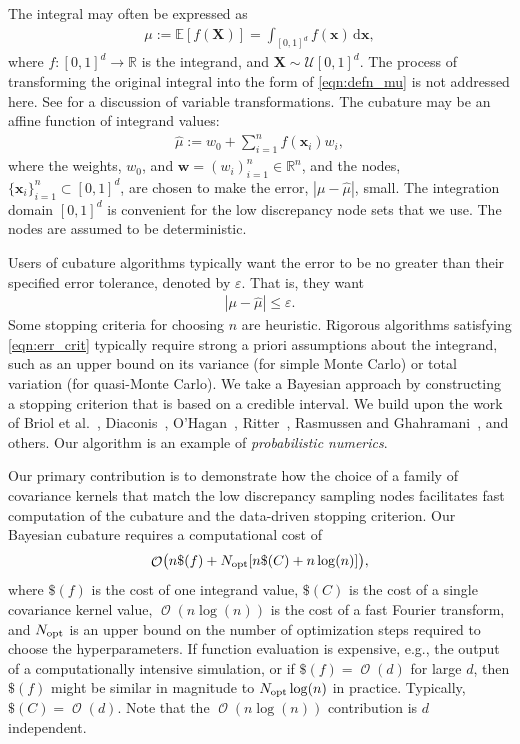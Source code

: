 \documentclass{svjour3}                     %
\DeclareMathOperator{\Order}{{\mathcal O}}
\newcommand{\bm}[1]{\boldsymbol{#1}}
\newcommand{\dif}[1]{\text{d}{#1}}
\newcommand{\reals}{\mathbb{R}}
\newcommand{\Ex}{\mathbb{E}}
\newcommand{\vw}{\bm{w}}
\newcommand{\vx}{\bm{x}}
\newcommand{\opt}{{\textup{opt}}}
\newcommand{\hmu}{\widehat{\mu}}
\newcommand{\errtol}{\varepsilon}
\def\abs#1{\ensuremath{\left \lvert #1 \right \rvert}}
\begin{document}
The integral may often be expressed as
\begin{align}
\label{eqn:defn_mu}
\mu:= \Ex[f(\boldsymbol{X})] = \int_{[0,1]^d} f(\vx)\, \dif\vx, 
\end{align}
where $f:[0,1]^d \to \reals$ is the integrand, and $\boldsymbol{X} \sim \mathcal{U}[0,1]^d$.  The process of transforming the original integral into the form of \eqref{eqn:defn_mu} is not addressed here. See \cite[Section 2.11]{DicEtal14a} 
for a discussion of variable transformations. The cubature may be an affine function of integrand values:
\begin{align}
\label{eqn:defn_hmu}  %
\hmu := w_0 + \sum_{i=1}^{n} f(\vx_i) w_i,
\end{align}
where the weights, $w_0$, and  $\vw = (w_i)_{i=1}^n \in \reals^n$, and the nodes, $\{\vx_i\}_{i=1}^n \subset [0,1]^d$, are chosen to make the error, $\abs{\mu - \hmu}$, small. The integration domain $[0,1]^d$ is convenient for the low discrepancy node sets \cite{DicEtal14a,SloJoe94} that we use.  The nodes are assumed to be deterministic.

Users of cubature algorithms typically want the error to be no greater than their specified error tolerance, denoted by $\varepsilon$.  That is, they want
\begin{align}
\label{eqn:err_crit} 
\abs{\mu - \hmu} \leq \errtol .
\end{align}
Some stopping criteria for choosing $n$ are heuristic.  Rigorous algorithms satisfying \eqref{eqn:err_crit}  typically require strong a priori assumptions about the integrand, such as an upper bound on its variance (for simple Monte Carlo) or total variation (for quasi-Monte Carlo).  We take a Bayesian approach by constructing a stopping criterion that is based on a credible interval.  We build upon the work of Briol et al.~\cite{BriEtal18a}, Diaconis~\cite{Dia88a}, O'Hagan~\cite{OHa91a}, Ritter~\cite{Rit00a}, Rasmussen and Ghahramani~\cite{RasGha03a}, and others.  Our algorithm is an example of \emph{probabilistic numerics}.

Our primary contribution is to demonstrate how the choice of a family of covariance kernels that match the low discrepancy sampling nodes facilitates fast computation of the cubature and the data-driven stopping criterion.  Our Bayesian cubature requires a computational cost of
\begin{equation} \label{eqn:OuralgoCost}
    \Order\bigl(n \$(f) + N_{\opt}[n\$(C) + n \log(n)] \bigr),
\end{equation} 
where $\$(f)$ is the cost of one integrand value, $\$(C)$ is the cost of a single covariance kernel value,  $\Order(n \log(n))$ is the cost of a fast Fourier transform, and $N_{\opt}$ is an upper bound on the number of optimization steps required to choose the hyperparameters. If function evaluation is expensive, e.g., the output of a computationally intensive simulation, or if $\$(f) = \Order(d)$ for large $d$, then $\$(f)$ might be similar in magnitude to $N_{\opt} \log(n)$ in practice.  Typically, $\$(C) = \Order(d)$.  Note that the $\Order(n \log(n))$ contribution is $d$ independent.
\end{document}
